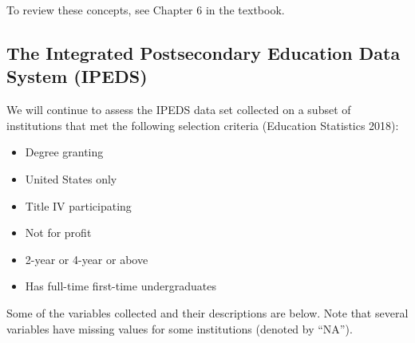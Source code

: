 \documentclass[
]{report}
\begin{document}
To review these concepts, see Chapter 6 in the textbook.

\subsection{The Integrated Postsecondary Education Data System (IPEDS)}\label{the-integrated-postsecondary-education-data-system-ipeds-1}

We will continue to assess the IPEDS data set collected on a subset of institutions that met the following selection criteria (Education Statistics 2018):

\begin{itemize}
\item
  Degree granting
\item
  United States only
\item
  Title IV participating
\item
  Not for profit
\item
  2-year or 4-year or above
\item
  Has full-time first-time undergraduates
\end{itemize}

Some of the variables collected and their descriptions are below. Note that several variables have missing values for some institutions (denoted by ``NA'').
\end{document}
